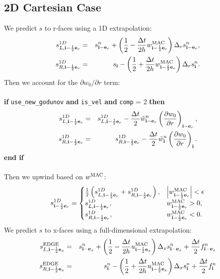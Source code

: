 \subsection{2D Cartesian Case}
We predict $s$ to r-faces using a 1D extrapolation:
\begin{eqnarray}
s_{L,{\bf i}-\frac{1}{2}{\bf e}_r}^{1D} &=& s_{{\bf i}-{\bf e}_r}^n + \left(\frac{1}{2} - \frac{\Delta t}{2h}w_{{\bf i}-\frac{1}{2}{\bf e}_r}^{\rm MAC}\right)\Delta_r s_{{\bf i}-{\bf e}_r}^n, \\
s_{R,{\bf i}-\frac{1}{2}{\bf e}_r}^{1D} &=& s_{{\bf i}} - \left(\frac{1}{2} + \frac{\Delta t}{2h}w_{{\bf i}-\frac{1}{2}{\bf e}_r}^{\rm MAC}\right)\Delta_r s_{{\bf i}}^n.
\end{eqnarray}
Then we account for the $\partial w_0/\partial r$ term:\\ \\
{\bf if} {\tt use\_new\_godunov} {\bf and} {\tt is\_vel} {\bf and} {\tt comp} = 2 {\bf then}
\begin{eqnarray}
s_{L,{\bf i}-\frac{1}{2}{\bf e}_r}^{1D} &=& s_{L,{\bf i}-\frac{1}{2}{\bf e}_r}^{1D} - \frac{\Delta t}{2}\tilde{w}_{{\bf i}-{\bf e}_r}^n\left(\frac{\partial w_0}{\partial r}\right)_{{\bf i}-{\bf e}_r}, \\
s_{R,{\bf i}-\frac{1}{2}{\bf e}_r}^{1D} &=& s_{R,{\bf i}-\frac{1}{2}{\bf e}_r}^{1D} - \frac{\Delta t}{2}\tilde{w}_{{\bf i}}^n\left(\frac{\partial w_0}{\partial r}\right)_{{\bf i}}.
\end{eqnarray}
{\bf end if}\\ \\
Then we upwind based on $w^{\rm MAC}$:
\begin{equation}
s_{{\bf i}-\frac{1}{2}{\bf e}_r}^{1D} =
\begin{cases}
\frac{1}{2}\left(s_{L,{\bf i}-\frac{1}{2}{\bf e}_r}^{1D} + s_{R,{\bf i}-\frac{1}{2}{\bf e}_r}^{1D}\right), & \left|w^{\rm MAC}_{{\bf i}-\frac{1}{2}{\bf e}_r}\right| < \epsilon \\
s_{L,{\bf i}-\frac{1}{2}{\bf e}_r}^{1D}, & w^{\rm MAC}_{{\bf i}-\frac{1}{2}{\bf e}_r} > 0, \\
s_{R,{\bf i}-\frac{1}{2}{\bf e}_r}^{1D}, & w^{\rm MAC}_{{\bf i}-\frac{1}{2}{\bf e}_r} < 0. \\
\end{cases}
\end{equation}
We predict $s$ to x-faces using a full-dimensional extrapolation:
\begin{eqnarray}
s_{L,{\bf i}-\frac{1}{2}{\bf e}_x}^{\rm EDGE} &=& s_{{\bf i}-{\bf e}_x}^n +  \left(\frac{1}{2} - \frac{\Delta t}{2h}u_{{\bf i}-\frac{1}{2}{\bf e}_x}^{\rm MAC}\right)\Delta_x s_{{\bf i}-{\bf e}_x}^n + \frac{\Delta t}{2}f_{{\bf i}-{\bf e}_x}^n \\
s_{R,{\bf i}-\frac{1}{2}{\bf e}_x}^{\rm EDGE} &=& s_{{\bf i}}^n - \left(\frac{1}{2} + \frac{\Delta t}{2h}u_{{\bf i}-\frac{1}{2}{\bf e}_x}^{\rm MAC}\right)\Delta_x s_{{\bf i}}^n + \frac{\Delta t}{2}f_{{\bf i}}^n 
\end{eqnarray}
